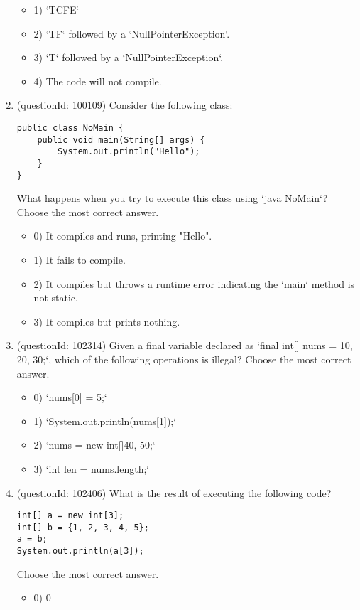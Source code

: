 \documentclass[12pt]{article}
\begin{document}
\begin{enumerate}[label=(\arabic*)]
\begin{itemize}
\item 1) `TCFE`

\item 2) `TF` followed by a `NullPointerException`.

\item 3) `T` followed by a `NullPointerException`.

\item 4) The code will not compile.

\end{itemize}
\item (questionId: 100109) Consider the following class:
\begin{verbatim}
public class NoMain {
    public void main(String[] args) {
        System.out.println("Hello");
    }
}
\end{verbatim}
What happens when you try to execute this class using `java NoMain`?
Choose the most correct answer. 
\begin{itemize}
\item 0) It compiles and runs, printing "Hello".

\item 1) It fails to compile.

\item 2) It compiles but throws a runtime error indicating the `main` method is not static.

\item 3) It compiles but prints nothing.

\end{itemize}
\item (questionId: 102314) Given a final variable declared as `final int[] nums = {10, 20, 30};`, which of the following operations is illegal?
Choose the most correct answer. 
\begin{itemize}
\item 0) `nums[0] = 5;`

\item 1) `System.out.println(nums[1]);`

\item 2) `nums = new int[]{40, 50};`

\item 3) `int len = nums.length;`

\end{itemize}
\item (questionId: 102406) What is the result of executing the following code?\begin{verbatim}
int[] a = new int[3];
int[] b = {1, 2, 3, 4, 5};
a = b;
System.out.println(a[3]);
\end{verbatim}
Choose the most correct answer. 
\begin{itemize}
\item 0) 0


\end{itemize}
\end{enumerate}
\end{document}
